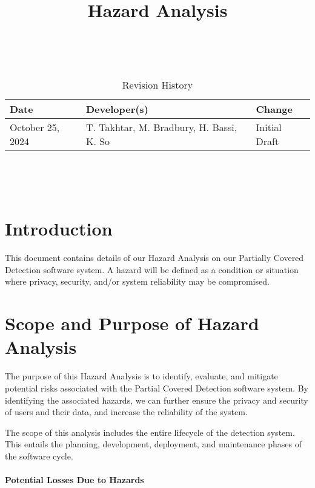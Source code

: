 \documentclass{article}
\title{Hazard Analysis\\\progname}
\author{\authname}
\date{}
\begin{document}
\maketitle
\thispagestyle{empty}

~\newpage


\begin{table}[hp]
\caption{Revision History} \label{TblRevisionHistory}
\begin{tabularx}{\textwidth}{llX}
\toprule
\textbf{Date} & \textbf{Developer(s)} & \textbf{Change}\\
\midrule
October 25, 2024 & T. Takhtar, M. Bradbury, H. Bassi, K. So & Initial Draft\\
\bottomrule
\end{tabularx}
\end{table}

~\newpage

\tableofcontents

~\newpage


\section{Introduction}

This document contains details of our Hazard Analysis on our Partially Covered Detection software system. 
A hazard will be defined as a condition or situation where privacy, security, and/or system reliability may be compromised.

\section{Scope and Purpose of Hazard Analysis}

The purpose of this Hazard Analysis is to identify, evaluate, and mitigate potential risks associated with the 
Partial Covered Detection software system. By identifying the associated hazards, we can further ensure the privacy 
and security of users and their data, and increase the reliability of the system.

The scope of this analysis includes the entire lifecycle of the detection system. This entails the planning, 
development, deployment, and maintenance phases of the software cycle.\\
\\
\textbf{Potential Losses Due to Hazards}
\end{document}
